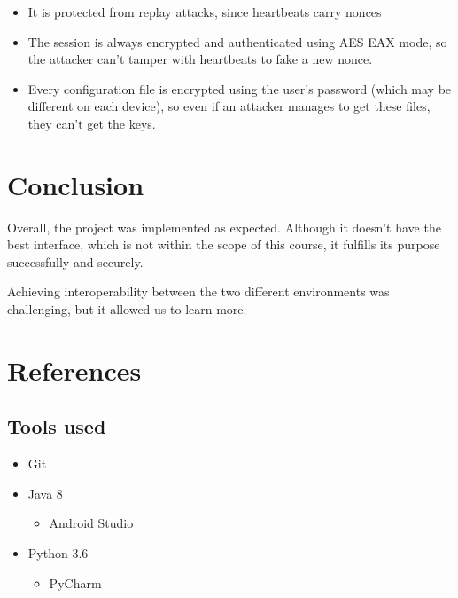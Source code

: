 \documentclass[11,]{article}
\providecommand{\tightlist}{%
  \setlength{\itemsep}{0pt}\setlength{\parskip}{0pt}}
\begin{document}
\begin{itemize}
\tightlist
\item
  It is protected from replay attacks, since heartbeats carry nonces
\item
  The session is always encrypted and authenticated using AES EAX mode,
  so the attacker can't tamper with heartbeats to fake a new nonce.
\item
  Every configuration file is encrypted using the user's password (which
  may be different on each device), so even if an attacker manages to
  get these files, they can't get the keys.
\end{itemize}

\hypertarget{conclusion}{%
\section{Conclusion}\label{conclusion}}

Overall, the project was implemented as expected. Although it doesn't
have the best interface, which is not within the scope of this course,
it fulfills its purpose successfully and securely.

Achieving interoperability between the two different environments was
challenging, but it allowed us to learn more.

\hypertarget{references}{%
\section{References}\label{references}}

\hypertarget{tools-used}{%
\subsection{Tools used}\label{tools-used}}

\begin{itemize}
\tightlist
\item
  Git
\item
  Java 8

  \begin{itemize}
  \tightlist
  \item
    Android Studio
  \end{itemize}
\item
  Python 3.6

  \begin{itemize}
  \tightlist
  \item
    PyCharm
  \end{itemize}
\end{itemize}
\end{document}
